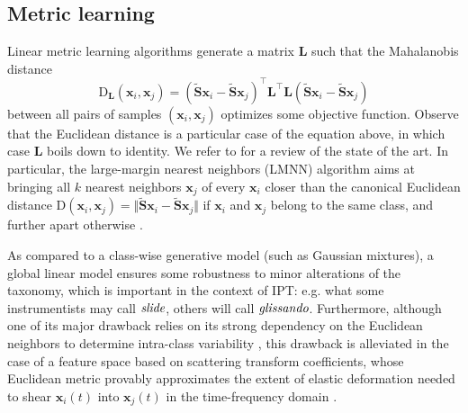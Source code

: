 \documentclass{article}
\makeatletter
\newcommand*{\eg}{e.g.\@\xspace}
\makeatother
\begin{document}
\subsection{Metric learning} %



Linear metric learning algorithms generate a matrix $\mathbf{L}$ such that the Mahalanobis distance
\begin{equation}
\mathrm{D}_\mathbf{L}(\boldsymbol{x}_i, \boldsymbol{x}_j) = (\widetilde{\mathbf{S}}\boldsymbol{x}_i - \widetilde{\mathbf{S}}\boldsymbol{x}_j)^{\top}  \mathbf{L}^{\top} \mathbf{L} (\widetilde{\mathbf{S}}\boldsymbol{x}_i-\widetilde{\mathbf{S}}\boldsymbol{x}_j)
\end{equation}
between all pairs of samples $(\boldsymbol{x}_i, \boldsymbol{x}_j)$ optimizes some objective function.
Observe that the Euclidean distance is a particular case of the equation above, in which case $\mathbf{L}$ boils down to identity.
We refer to \cite{bellet2013survey} for a review of the state of the art.
In particular, the large-margin nearest neighbors (LMNN) algorithm aims at bringing all $k$ nearest neighbors $\boldsymbol{x}_j$ of every $\boldsymbol{x}_i$ closer than the canonical Euclidean distance $\mathrm{D}(\boldsymbol{x}_i, \boldsymbol{x}_j) = \Vert \widetilde{\mathbf{S}}\boldsymbol{x}_i - \widetilde{\mathbf{S}}\boldsymbol{x}_j \Vert$ if $\boldsymbol{x}_i$ and $\boldsymbol{x}_j$ belong to the same class, and further apart otherwise \cite{weinberger2009jmlr}.

As compared to a class-wise generative model (such as Gaussian mixtures), a global linear model ensures some robustness to minor alterations of the taxonomy, which is important in the context of IPT: \eg{} what some instrumentists may call $\emph{slide}$, others will call $\emph{glissando}$.
Furthermore, although one of its major drawback relies on its strong dependency on the Euclidean neighbors to determine intra-class variability \cite{mcfee2010icml}, this drawback is alleviated in the case of a feature space based on scattering transform coefficients, whose Euclidean metric provably approximates the extent of elastic deformation needed to shear $\boldsymbol{x}_i(t)$ into $\boldsymbol{x}_j(t)$ in the time-frequency domain \cite[Theorem 2.16]{mallat2012cpam}.
\end{document}
